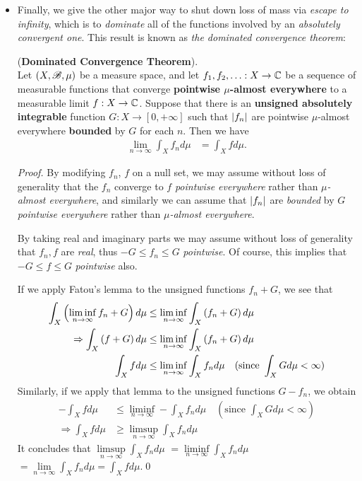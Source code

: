 \documentclass[11pt]{article}
\begin{document}
\begin{itemize}
\item Finally, we give the other major way to shut down loss of mass via \emph{escape to infinity}, which is to \emph{dominate} all of the functions involved by
an \emph{absolutely convergent one}. This result is known as \emph{the dominated convergence theorem}:

\begin{theorem} (\textbf{Dominated Convergence Theorem}). \\
Let $(X, {\mathscr B}, \mu)$ be a measure space, and let $f_1, f_2, \ldots : X\rightarrow {\mathbb C}$ be a sequence of measurable functions that converge \textbf{pointwise $\mu$-almost everywhere} to a measurable limit $f : X\rightarrow {\mathbb C}$. Suppose that there is an \textbf{unsigned absolutely integrable} function $G : X\rightarrow [0, +\infty]$ such that $\left\lvert f_n \right\rvert$ are pointwise $\mu$-almost everywhere \textbf{bounded} by $G$ for each $n$. Then we have
\begin{align*}
\lim\limits_{n\rightarrow \infty}\int_{X}f_{n}d\mu  &= \int_{X}f d\mu.
\end{align*}
\end{theorem}
\begin{proof}
By modifying $f_n$, $f$ on a null set, we may assume without loss of generality that the $f_n$ converge to $f$ \emph{pointwise everywhere} rather than \emph{$\mu$-almost everywhere}, and similarly we can assume that $\left\lvert f_n \right\rvert$ are \emph{bounded} by $G$ \emph{pointwise everywhere} rather than \emph{$\mu$-almost everywhere}.

By taking real and imaginary parts we may assume without loss of generality that $f_n,  f$ are \emph{real}, thus $-G \le  f_n \le G$ \emph{pointwise}. Of course, this implies that $-G \le  f \le G$ \emph{pointwise} also. 

If we apply Fatou's lemma  to the unsigned functions $f_n + G$, we see that
\begin{align*}
\int_{X}\left(\liminf\limits_{n\rightarrow \infty}f_n + G\right)d\mu &\le \liminf\limits_{n\rightarrow \infty}\int_{X}\left(f_{n}+ G\right)d\mu\\
\Rightarrow \int_{X}\left(f + G\right)d\mu &\le \liminf\limits_{n\rightarrow \infty}\int_{X}\left(f_{n}+ G\right)d\mu\\
\int_{X}fd\mu &\le \liminf\limits_{n\rightarrow \infty }\int_{X}f_{n}d\mu \quad (\text{since } \int_{X}G d\mu < \infty )
\end{align*}
Similarly, if we apply that lemma to the unsigned functions $G - f_n$, we obtain
\begin{align*}
-\int_{X}fd\mu &\le \liminf\limits_{n\rightarrow \infty }-\int_{X}f_{n}d\mu \quad (\text{since } \int_{X}G d\mu < \infty )\\
\Rightarrow \int_{X}fd\mu &\ge \limsup\limits_{n\rightarrow \infty }\int_{X}f_{n}d\mu 
\end{align*}
It concludes that $ \limsup\limits_{n\rightarrow \infty }\int_{X}f_{n}d\mu$ $=\liminf\limits_{n\rightarrow \infty }\int_{X}f_{n}d\mu$ $=\lim\limits_{n\rightarrow \infty }\int_{X}f_{n}d\mu=\int_{X}fd\mu$.\qed
\end{proof}


\end{itemize}
\end{document}
